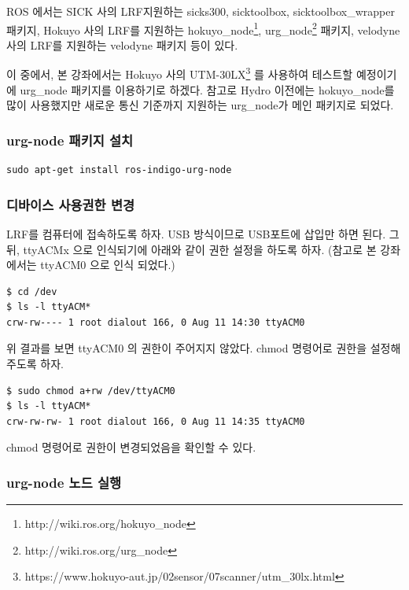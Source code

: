ROS 에서는 SICK 사의 LRF지원하는 sicks300, sicktoolbox, sicktoolbox\_wrapper 패키지, Hokuyo 사의 LRF를 지원하는 hokuyo\_node\footnote{http://wiki.ros.org/hokuyo\_node}, urg\_node\footnote{http://wiki.ros.org/urg\_node} 패키지, velodyne 사의 LRF를 지원하는 velodyne 패키지 등이 있다.

이 중에서, 본 강좌에서는 Hokuyo 사의 UTM-30LX\footnote{https://www.hokuyo-aut.jp/02sensor/07scanner/utm\_30lx.html} 를 사용하여 테스트할 예정이기에 urg\_node 패키지를 이용하기로 하겠다. 참고로 Hydro 이전에는 hokuyo\_node를 많이 사용했지만 새로운 통신 기준까지 지원하는 urg\_node가 메인 패키지로 되었다.

\subsubsection{urg-node 패키지 설치}

\begin{lstlisting}[language=ROS]
sudo apt-get install ros-indigo-urg-node 
\end{lstlisting}

\subsubsection{디바이스 사용권한 변경}

LRF를 컴퓨터에 접속하도록 하자. USB 방식이므로 USB포트에 삽입만 하면 된다. 그 뒤, ttyACMx 으로 인식되기에 아래와 같이 권한 설정을 하도록 하자. (참고로 본 강좌에서는 ttyACM0 으로 인식 되었다.)

\begin{lstlisting}[language=ROS]
$ cd /dev
$ ls -l ttyACM*
crw-rw---- 1 root dialout 166, 0 Aug 11 14:30 ttyACM0
\end{lstlisting}

위 결과를 보면 ttyACM0 의 권한이 주어지지 않았다. chmod 명령어로 권한을 설정해 주도록 하자.

\begin{lstlisting}[language=ROS]
$ sudo chmod a+rw /dev/ttyACM0
$ ls -l ttyACM*
crw-rw-rw- 1 root dialout 166, 0 Aug 11 14:35 ttyACM0
\end{lstlisting}

chmod 명령어로 권한이 변경되었음을 확인할 수 있다.

\subsubsection{urg-node 노드 실행}

